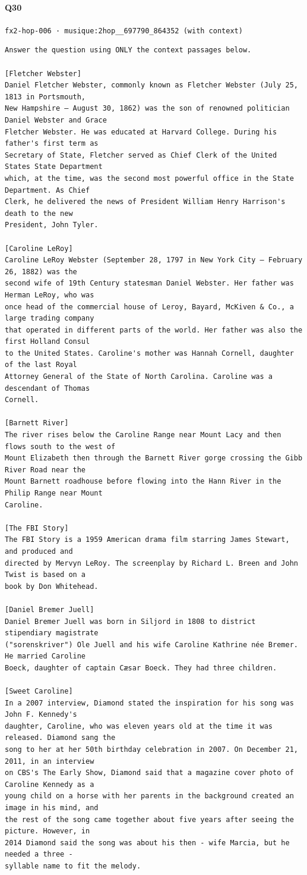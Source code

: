 \documentclass[10pt]{article}
\begin{document}
\paragraph{Q30} \texttt{fx2-hop-006  ·  musique:2hop\_\_697790\_864352 (with context)}
\begin{verbatim}
Answer the question using ONLY the context passages below.

[Fletcher Webster]
Daniel Fletcher Webster, commonly known as Fletcher Webster (July 25, 1813 in Portsmouth,
New Hampshire – August 30, 1862) was the son of renowned politician Daniel Webster and Grace
Fletcher Webster. He was educated at Harvard College. During his father's first term as
Secretary of State, Fletcher served as Chief Clerk of the United States State Department
which, at the time, was the second most powerful office in the State Department. As Chief
Clerk, he delivered the news of President William Henry Harrison's death to the new
President, John Tyler.

[Caroline LeRoy]
Caroline LeRoy Webster (September 28, 1797 in New York City – February 26, 1882) was the
second wife of 19th Century statesman Daniel Webster. Her father was Herman LeRoy, who was
once head of the commercial house of Leroy, Bayard, McKiven & Co., a large trading company
that operated in different parts of the world. Her father was also the first Holland Consul
to the United States. Caroline's mother was Hannah Cornell, daughter of the last Royal
Attorney General of the State of North Carolina. Caroline was a descendant of Thomas
Cornell.

[Barnett River]
The river rises below the Caroline Range near Mount Lacy and then flows south to the west of
Mount Elizabeth then through the Barnett River gorge crossing the Gibb River Road near the
Mount Barnett roadhouse before flowing into the Hann River in the Philip Range near Mount
Caroline.

[The FBI Story]
The FBI Story is a 1959 American drama film starring James Stewart, and produced and
directed by Mervyn LeRoy. The screenplay by Richard L. Breen and John Twist is based on a
book by Don Whitehead.

[Daniel Bremer Juell]
Daniel Bremer Juell was born in Siljord in 1808 to district stipendiary magistrate
("sorenskriver") Ole Juell and his wife Caroline Kathrine née Bremer. He married Caroline
Boeck, daughter of captain Cæsar Boeck. They had three children.

[Sweet Caroline]
In a 2007 interview, Diamond stated the inspiration for his song was John F. Kennedy's
daughter, Caroline, who was eleven years old at the time it was released. Diamond sang the
song to her at her 50th birthday celebration in 2007. On December 21, 2011, in an interview
on CBS's The Early Show, Diamond said that a magazine cover photo of Caroline Kennedy as a
young child on a horse with her parents in the background created an image in his mind, and
the rest of the song came together about five years after seeing the picture. However, in
2014 Diamond said the song was about his then - wife Marcia, but he needed a three -
syllable name to fit the melody.


\end{verbatim}
\end{document}
